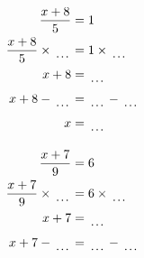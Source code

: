 \documentclass[12pt]{article}
\newcounter{minipagecount}
\begin{document}
\begin{multicols}{2}
\begin{minipage}[t]{0.45\textwidth}
    \raggedright %
    \begin{align*} %
        \frac{x + 8}{5} &= 1\\
        \frac{x + 8}{5} \times\dotuline{\hspace{5mm}} &= 1 \times\dotuline{\hspace{5mm}}\\
        x + 8 &= \dotuline{\hspace{5mm}}\\
        x + 8 - \dotuline{\hspace{5mm}} &= \dotuline{\hspace{5mm}} - \dotuline{\hspace{5mm}}\\
        x &= \dotuline{\hspace{5mm}}\\
    \end{align*}
\end{minipage} %
\noindent{(\theminipagecount)}\hspace{0.1mm} %
\begin{minipage}[t]{0.45\textwidth} %
    \vspace{-26pt}  %
    \raggedright %
    \begin{align*} %
        \frac{x + 7}{9} &= 6\\
        \frac{x + 7}{9} \times\dotuline{\hspace{5mm}} &= 6 \times\dotuline{\hspace{5mm}}\\
        x + 7 &= \dotuline{\hspace{5mm}}\\
        x + 7 - \dotuline{\hspace{5mm}} &= \dotuline{\hspace{5mm}} - \dotuline{\hspace{5mm}}\\

\end{align*}
\end{minipage}
\end{multicols}
\end{document}
